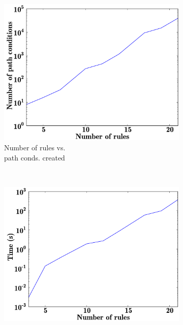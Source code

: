\begin{figure}[htb]
        \centering
        \begin{subfigure}[b]{0.26\textwidth}
                \centering
                \includegraphics[width=1\textwidth]{./figures/results/rules_vs_pcs.pdf}
                \caption{Number of rules vs. \\path conds. created}
                \label{fig:rules_vs_pcs}
        \end{subfigure}%
        ~~
        \begin{subfigure}[b]{0.26\textwidth}
                \centering
                \includegraphics[width=1\textwidth]{./figures/results/rules_vs_time.pdf}

\end{subfigure}
\end{figure}
